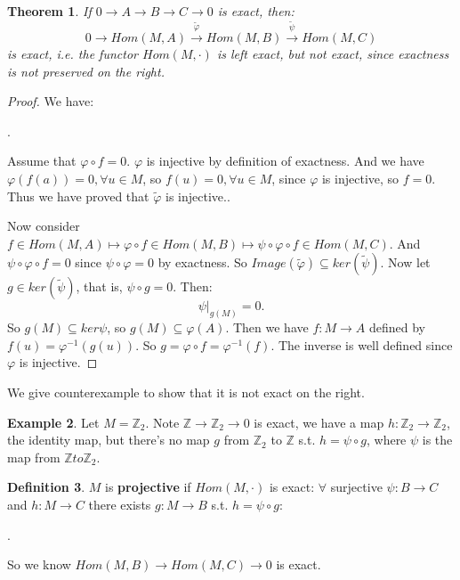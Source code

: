 \documentclass[9pt,reqno,twoside]{amsbook}
\theoremstyle{plain}
\newtheorem{theorem}{Theorem}[chapter]
\numberwithin{section}{chapter}
\numberwithin{equation}{chapter}
\theoremstyle{definition}
\newtheorem{Def}[theorem]{Definition}
\newtheorem{Ex}[theorem]{Example}
\theoremstyle{remark}
\theoremstyle{plain}
\newcommand{\sub}{\subseteq}
\newcommand{\z}{\mathbb{Z}}
\renewcommand{\phi}{\varphi}
\begin{document}
\begin{theorem}
If $0 \to A \to B \to C \to 0$ is exact, then:
$$
0 \to Hom(M,A) \overset{\tilde{\phi}}{\to} Hom(M,B) \overset{\tilde{\psi}}{\to} Hom(M,C)
$$
is exact, i.e. the functor $Hom(M,\cdot)$ is left exact, but not exact, since exactness is not preserved on the right. 
\end{theorem}

\begin{proof}
We have:
\begin{center}
. 
\end{center}
Assume that $\phi \circ f = 0$. $\phi$ is injective by definition of exactness. And we have $\phi(f(a)) = 0, \forall u \in M$, so $f(u) = 0, \forall u \in M$, since $\phi$ is injective, so $f = 0$. Thus we have proved that $\tilde{\phi}$ is injective.. 

 Now consider $f \in Hom(M,A) \mapsto \phi \circ f \in Hom(M,B) \mapsto \psi \circ \phi \circ f \in Hom(M,C)$. And $\psi \circ \phi \circ f = 0$ since $\psi \circ \phi = 0$ by exactness. So  $Image(\tilde{\phi}) \sub ker(\tilde{\psi})$. Now let $g \in ker(\tilde{\psi})$, that is, $\psi \circ g = 0$. Then:
$$
\psi\rvert_{g(M)} = 0.
$$
So $g(M) \sub ker\psi$, so $g(M) \sub \phi(A)$. Then we have $f: M \to A$ defined by $f(u) = \phi^{-1}(g(u))$. So $g = \phi \circ f = \phi^{-1}(f)$. The inverse is well defined since $\phi$ is injective. 
\end{proof}

We give counterexample to show that it is not exact on the right. 

\begin{Ex}
Let $M = \z_2$. Note $\z \to \z_2 \to 0$ is exact, we have a map $h: \z_2 \to \z_2$, the identity map, but there's no map $g$ from $\z_2$ to $\z$ s.t. $h = \psi \circ g$, where $\psi$ is the map from $\z to \z_2$. 
\end{Ex}

\begin{Def}
$M$ is \textbf{projective} if $Hom(M,\cdot)$ is exact: $\forall$ surjective $\psi:B \to C$ and $h:M \to C$ there exists $g:M \to B$ s.t. $h = \psi \circ g$:
\begin{center}
. 
\end{center}
So we know $Hom(M,B) \to Hom(M,C) \to 0$ is exact. 
\end{Def}
\end{document}
